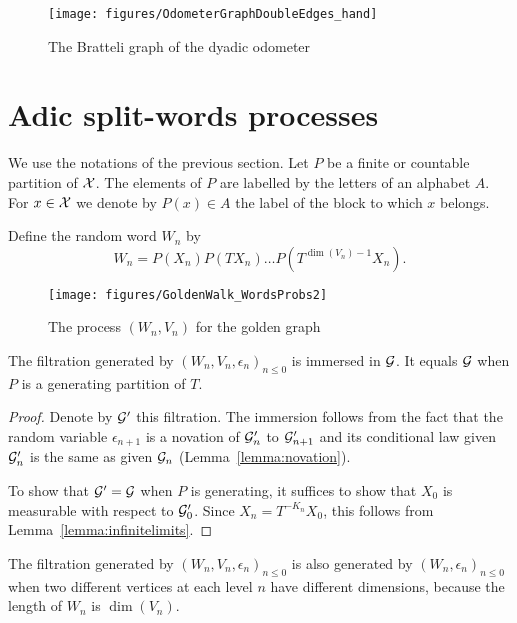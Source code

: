 \documentclass[12pt,a4paper]{article}
\begin{document}
\begin{figure}[!h]
\centering
	\texttt{[image: figures/OdometerGraphDoubleEdges\_hand]}
\caption{The Bratteli graph of the dyadic odometer}
\label{fig:graphodometer}
\end{figure}




\section{Adic split-words processes}

We use the notations of the previous section. 
Let $P$ be a finite or countable partition of $\mathcal{X}$. 
The elements of $P$ are labelled by the letters of an alphabet $A$. 
For $x \in \mathcal{X}$ we denote by $P(x) \in A$ the label of the block to which $x$ belongs.

Define the random word $W_n$ by 
$$
W_n = P(X_n)P(TX_n)\ldots P(T^{\dim(V_n)-1}X_n).
$$

\begin{figure}[!h]
\centering
	\texttt{[image: figures/GoldenWalk\_WordsProbs2]}
\caption{The process $(W_n, V_n)$ for the golden graph}
\end{figure}

\begin{lemma}
The filtration generated by ${(W_n,V_n,\epsilon_n)}_{n \leq 0}$  
is immersed in $\mathcal{G}$. 
It equals $\mathcal{G}$ when $P$ is a generating partition of $T$.
\end{lemma}

\begin{proof}
Denote by $\mathcal{G}'$ this filtration. The immersion follows from the fact 
that the random variable $\epsilon_{n+1}$ is 
a novation of $\mathcal{G}'_n$ to $\mathcal{G}'_{n+1}$ and its conditional law given 
$\mathcal{G}'_n$ is the same as given $\mathcal{G}_n$ (Lemma~\ref{lemma:novation}).

To show that $\mathcal{G}'=\mathcal{G}$ when $P$ is generating, it suffices to show 
that $X_0$ is measurable with respect to $\mathcal{G}'_0$. 
Since $X_n=T^{-K_n}X_0$, this follows from Lemma~\ref{lemma:infinitelimits}. 
\end{proof}

The filtration generated by ${(W_n,V_n,\epsilon_n)}_{n \leq 0}$ 
is also generated by ${(W_n,\epsilon_n)}_{n \leq 0}$ when 
two different vertices at each level $n$ have different dimensions, 
because the length of $W_n$ is $\dim(V_n)$. 
\end{document}

